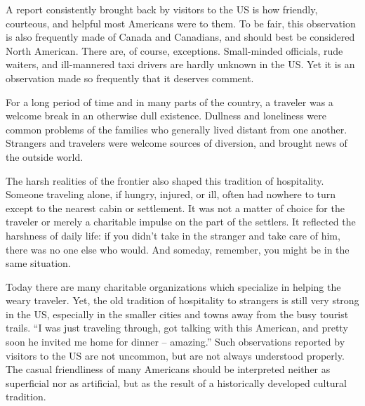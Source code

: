 \documentclass[a4paper]{article}
\begin{document}
\par
A report consistently brought back by visitors to the US is how friendly, courteous, and helpful most Americans were to them. To be fair, this observation is also frequently made of Canada and Canadians, and should best be considered North American. There are, of course, exceptions. Small-minded officials, rude waiters, and ill-mannered taxi drivers are hardly unknown in the US. Yet it is an observation made so frequently that it deserves comment.

\par
For a long period of time and in many parts of the country, a traveler was a welcome break in an otherwise dull existence. Dullness and loneliness were common problems of the families who generally lived distant from one another. Strangers and travelers were welcome sources of diversion, and brought news of the outside world.

\par
The harsh realities of the frontier also shaped this tradition of hospitality. Someone traveling alone, if hungry, injured, or ill, often had nowhere to turn except to the nearest cabin or settlement. It was not a matter of choice for the traveler or merely a charitable impulse on the part of the settlers. It reflected the harshness of daily life: if you didn’t take in the stranger and take care of him, there was no one else who would. And someday, remember, you might be in the same situation.

\par
Today there are many charitable organizations which specialize in helping the weary traveler. Yet, the old tradition of hospitality to strangers is still very strong in the US, especially in the smaller cities and towns away from the busy tourist trails. “I was just traveling through, got talking with this American, and pretty soon he invited me home for dinner -- amazing.” Such observations reported by visitors to the US are not uncommon, but are not always understood properly. The casual friendliness of many Americans should be interpreted neither as superficial nor as artificial, but as the result of a historically developed cultural tradition.
\end{document}
